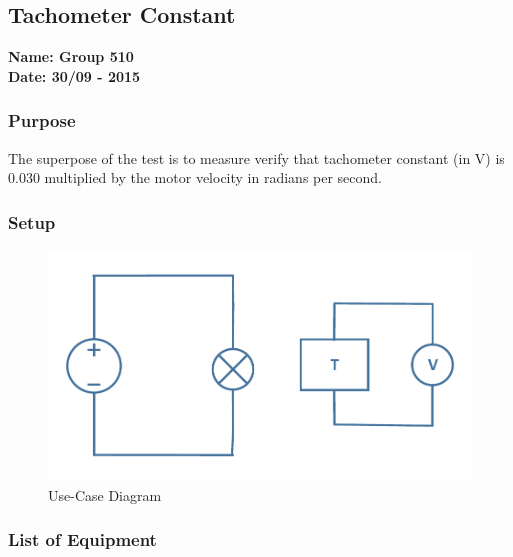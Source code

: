 \pagebreak
\subsection{Tachometer Constant} %
\textbf{Name: Group 510}\\
\textbf{Date: 30/09 - 2015}

\subsubsection{Purpose}
The superpose of the test is to measure verify that tachometer constant (in V) is 0.030 multiplied by the motor velocity in radians per second.

\subsubsection{Setup}
\begin{figure}[H]
  \centering
	\includegraphics[scale=0.5]{figures/MotorTest3.pdf}
	\caption{Use-Case Diagram}
	\flushleft
\end{figure}

\subsubsection{List of Equipment}

